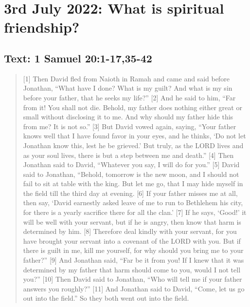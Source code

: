 \section{3rd July 2022: What is spiritual friendship?}
\subsection*{Text: 1 Samuel 20:1-17,35-42}
  \begin{quote}
    [1] Then David fled from Naioth in Ramah and came and said before
    Jonathan, “What have I done?  What is my guilt?  And what is my sin
    before your father, that he seeks my life?” [2] And he said to him, “Far
    from it!  You shall not die.  Behold, my father does nothing either great
    or small without disclosing it to me.  And why should my father hide this
    from me?  It is not so.” [3] But David vowed again, saying, “Your father
    knows well that I have found favor in your eyes, and he thinks, ‘Do not
    let Jonathan know this, lest he be grieved.’ But truly, as the LORD lives
    and as your soul lives, there is but a step between me and death.” [4]
    Then Jonathan said to David, “Whatever you say, I will do for you.” [5]
    David said to Jonathan, “Behold, tomorrow is the new moon, and I should
    not fail to sit at table with the king.  But let me go, that I may hide
    myself in the field till the third day at evening.  [6] If your father
    misses me at all, then say, ‘David earnestly asked leave of me to run to
    Bethlehem his city, for there is a yearly sacrifice there for all the
    clan.’ [7] If he says, ‘Good!’ it will be well with your servant, but if
    he is angry, then know that harm is determined by him.  [8] Therefore
    deal kindly with your servant, for you have brought your servant into a
    covenant of the LORD with you.  But if there is guilt in me, kill me
    yourself, for why should you bring me to your father?” [9] And Jonathan
    said, “Far be it from you!  If I knew that it was determined by my father
    that harm should come to you, would I not tell you?” [10] Then David said
    to Jonathan, “Who will tell me if your father answers you roughly?” [11]
    And Jonathan said to David, “Come, let us go out into the field.” So they
    both went out into the field.


\end{quote}
